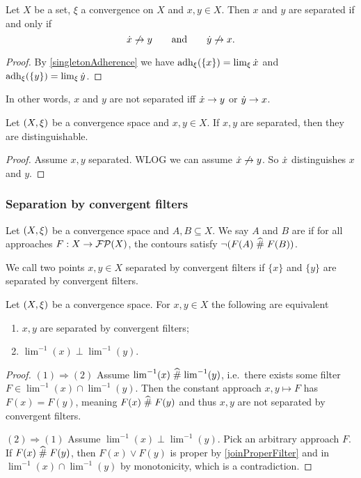 \begin{proposition} \label{separatednessPrincipalUltrafilters}
Let $X$ be a set, $\xi$ a convergence on $X$ and $x,y\in X$. Then $x$ and $y$ are separated \textup{if and only if}
\[ \dot{x} \not\to y \qquad \text{and}\qquad \dot{y}\not\to x. \]
\end{proposition}
\begin{proof}
By \ref{singletonAdherence} we have $\operatorname{adh}_\xi(\{x\}) = \lim_\xi\dot{x}$ and $\operatorname{adh}_\xi(\{y\}) = \lim_\xi\dot{y}$.
\end{proof}
In other words, $x$ and $y$ are not separated iff $\dot{x} \to y$ or $\dot{y} \to x$.

\begin{lemma} \label{separatedDistinguishable}
Let $\left( X,\xi \right)$ be a convergence space and $x,y\in X$. If $x,y$ are separated, then they are distinguishable.
\end{lemma}
\begin{proof}
Assume $x,y$ separated. WLOG we can assume $\dot{x} \not\to y$. So $\dot{x}$ distinguishes $x$ and $y$.
\end{proof}

\subsubsection{Separation by convergent filters}
\begin{definition}
Let $\left( X,\xi \right)$ be a convergence space and $A,B\subseteq X$. We say $A$ and $B$ are  if for all approaches $F:X\to \operatorname{\mathcal{FP}}(X)$, the contours satisfy $\neg(F(A)\mathrel{\widehat{\#}} F(B))$.

We call two points $x,y\in X$ separated by convergent filters if $\{x\}$ and $\{y\}$ are separated by convergent filters.
\end{definition}

\begin{lemma} \label{pointsSeparatedConvergentFilters}
Let $\left( X,\xi \right)$ be a convergence space. For $x,y\in X$ the following are equivalent
\begin{enumerate}
\item $x,y$ are separated by convergent filters;
\item $\lim^{-1}(x)\perp \lim^{-1}(y)$.
\end{enumerate}
\end{lemma}
\begin{proof}
$(1) \Rightarrow (2)$ Assume $\lim^{-1}(x)\mathrel{\widehat{\#}} \lim^{-1}(y)$, i.e.\ there exists some filter $F\in \lim^{-1}(x)\cap \lim^{-1}(y)$. Then the constant approach $x,y\mapsto F$ has $F(x) = F(y)$, meaning $F(x)\mathrel{\widehat{\#}} F(y)$ and thus $x,y$ are not separated by convergent filters.

$(2) \Rightarrow (1)$ Assume $\lim^{-1}(x)\perp \lim^{-1}(y)$. Pick an arbitrary approach $F$. If $F(x)\mathrel{\widehat{\#}} F(y)$, then $F(x)\vee F(y)$ is proper by \ref{joinProperFilter} and in $\lim^{-1}(x)\cap \lim^{-1}(y)$ by monotonicity, which is a contradiction.
\end{proof}


